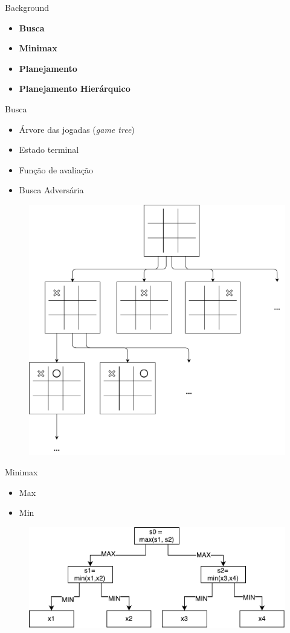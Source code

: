 \documentclass{beamer}
\begin{document}
{
	\begin{frame}{Background}
		\vspace{5mm}
		\begin{itemize}
			\item \textbf{Busca}
			\item \textbf{Minimax}
			\item \textbf{Planejamento}       		
			\item \textbf{Planejamento Hierárquico}
		\end{itemize}
	\end{frame}
}
\begin{frame}{Busca}
	\begin{itemize}
		\item Árvore das jogadas (\textit{game tree})
		\item Estado terminal
		\item Função de avaliação
		\item Busca Adversária
	\end{itemize}
	
	\begin{figure}[here]
		\includegraphics[width=0.45\linewidth]{fig/jogodavelha.pdf}	
	\end{figure}
\end{frame}
\begin{frame}{Minimax}
	\begin{itemize}
		\item Max
		\item Min
	\end{itemize}
	
	\vspace{-3mm}
	\begin{figure}[here]
		\includegraphics[width=0.8\linewidth]{fig/gametree.pdf}	
	\end{figure}	
\end{frame}
\end{document}
